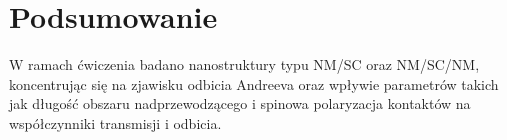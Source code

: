 \documentclass{article}
\begin{document}
\section{Podsumowanie}
W ramach ćwiczenia badano nanostruktury typu NM/SC oraz NM/SC/NM, koncentrując się na zjawisku odbicia Andreeva oraz wpływie parametrów takich jak długość obszaru nadprzewodzącego i spinowa polaryzacja kontaktów na współczynniki transmisji i odbicia.
\end{document}
